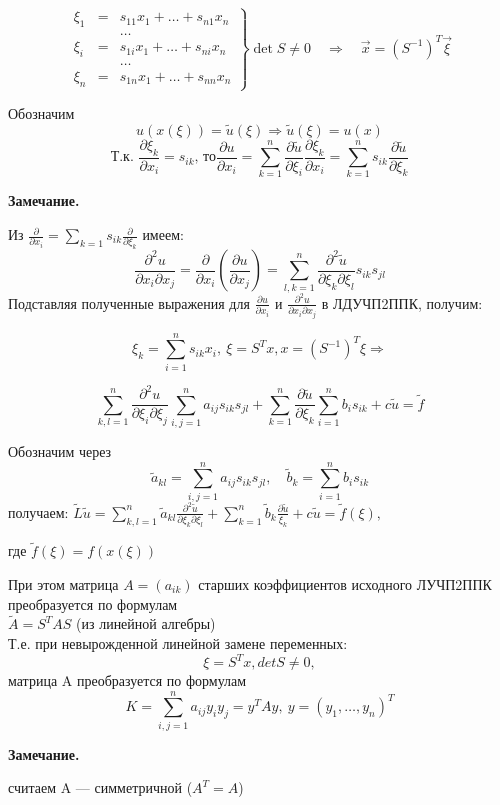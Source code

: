 \documentclass{article}
\newenvironment{note}{\par\medskip\noindent
  \textbf{Замечание. }\par\nobreak\noindent\ignorespaces
}{\par\medskip
}
\begin{document}
\[
\left.
\begin{array}{rcl}
\xi_1 &=& s_{11}x_1 + \ldots + s_{n1}x_n \\
      & & \ldots \\
\xi_i &=& s_{1i}x_1 + \ldots + s_{ni}x_n \\
      & & \ldots \\
\xi_n &=& s_{1n}x_1 + \ldots + s_{nn}x_n
\end{array}
\right\}
\det S \neq 0
\quad\Longrightarrow\quad
\text{$\vec x=(S^{-1})^T\vec\xi$}
\]

Обозначим
\[
u(x(\xi))=\tilde{u}(\xi) \Rightarrow \tilde{u}(\xi)=u(x)\]
\[
\text{Т.к. } \frac{\partial \xi_k}{\partial x_i} = s_{ik} \text{, то} \frac{\partial u}{\partial x_i} = \sum_{k=1}^n\frac{\partial \tilde{u}}{\partial \xi_i}\frac{\partial \xi_k}{\partial x_i} = \sum_{k=1}^ns_{ik}\frac{\partial \tilde{u}}{\partial \xi_k}
\]


\begin{note}
Из $\displaystyle\frac{\partial }{\partial x_i} = \sum_{k=1}s_{ik}\frac{\partial}{\partial \xi_k}$ имеем:
\[\frac{\partial^2u}{\partial x_i \partial x_j}=\frac{\partial}{\partial x_i}(\frac{\partial u}{\partial x_j})=\sum_{l,k=1}^{n}\frac{\partial^2 \tilde{u}}{\partial\xi_k \partial\xi_l}s_{ik}s_{jl}\]
Подставляя полученные выражения для $\frac{\partial u}{\partial x_i}$ и $\frac{\partial^2 u}{\partial x_i \partial x_j}$ в ЛДУЧП2ППК, получим:

\[\xi_k=\sum_{i=1}^{n}s_{ik}x_i,\ \xi=S^Tx, x=(S^{-1})^T\xi\Rightarrow\]

\[
\sum_{k,l=1}^n \frac{\partial^2 u}{\partial \xi_i \partial \xi_j} \sum_{i,j=1}^n a_{ij}s_{ik}s_{jl} + \sum_{k=1}^n \frac{\partial \tilde{u}}{\partial \xi_k}\sum_{i=1}^nb_is_{ik}+c\tilde{u}=\tilde{f}
\]

Обозначим через 
\[\tilde{a}_{kl}=\sum_{i,j=1}^na_{ij}s_{ik}s_{jl}, \quad\tilde{b}_k=\sum_{i=1}^nb_is_{ik}\]
получаем:
$\displaystyle
\tilde{L}\tilde{u}=\sum_{k,l=1}^n\tilde{a}_{kl}\frac{\partial^2\tilde{u}}{\partial\xi_k\partial\xi_l}+\sum_{k=1}^n\tilde{b}_k\frac{\partial\tilde{u}}{\xi_k}+c\tilde{u}=\tilde{f}(\xi),
$

где $\tilde{f}(\xi)=f(x(\xi))$

При этом матрица $A=(a_{ik})$ старших коэффициентов исходного ЛУЧП2ППК преобразуется по формулам\\
$
\displaystyle
  \tilde{A}=S^TAS 
$
\quad (из линейной алгебры)\\
Т.е. при невырожденной линейной замене переменных:
\[
\xi=S^Tx, detS\ne0,
\] матрица A преобразуется по формулам
\[
K=\sum_{i,j=1}^na_{ij}y_iy_j=y^TAy,\ y=(y_1, \ldots, y_n)^T
\]
\end{note}

\begin{note}
считаем A --- симметричной ($A^T=A$)
\end{note}
 
\end{document}
